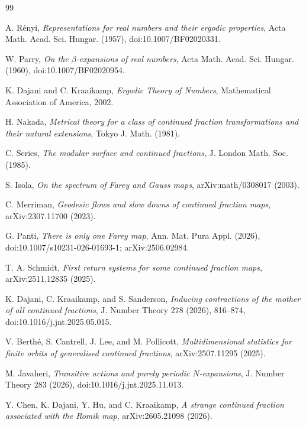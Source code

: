 \documentclass[11pt]{amsart}
\theoremstyle{definition}
\begin{document}
\begin{thebibliography}{99}

A. R\'enyi,
\emph{Representations for real numbers and their ergodic properties},
Acta Math. Acad. Sci. Hungar. (1957), doi:10.1007/BF02020331.

W. Parry,
\emph{On the $\beta$-expansions of real numbers},
Acta Math. Acad. Sci. Hungar. (1960), doi:10.1007/BF02020954.

K. Dajani and C. Kraaikamp,
\emph{Ergodic Theory of Numbers},
Mathematical Association of America, 2002.

H. Nakada,
\emph{Metrical theory for a class of continued fraction transformations and their natural extensions},
Tokyo J. Math. (1981).

C. Series,
\emph{The modular surface and continued fractions},
J. London Math. Soc. (1985).

S. Isola,
\emph{On the spectrum of Farey and Gauss maps},
arXiv:math/0308017 (2003).

C. Merriman,
\emph{Geodesic flows and slow downs of continued fraction maps},
arXiv:2307.11700 (2023).

G. Panti,
\emph{There is only one Farey map},
Ann. Mat. Pura Appl. (2026), doi:10.1007/s10231-026-01693-1; arXiv:2506.02984.

T. A. Schmidt,
\emph{First return systems for some continued fraction maps},
arXiv:2511.12835 (2025).

K. Dajani, C. Kraaikamp, and S. Sanderson,
\emph{Inducing contractions of the mother of all continued fractions},
J. Number Theory 278 (2026), 816--874, doi:10.1016/j.jnt.2025.05.015.

V. Berth\'e, S. Cantrell, J. Lee, and M. Pollicott,
\emph{Multidimensional statistics for finite orbits of generalised continued fractions},
arXiv:2507.11295 (2025).

M. Javaheri,
\emph{Transitive actions and purely periodic $N$-expansions},
J. Number Theory 283 (2026), doi:10.1016/j.jnt.2025.11.013.

Y. Chen, K. Dajani, Y. Hu, and C. Kraaikamp,
\emph{A strange continued fraction associated with the Romik map},
arXiv:2605.21098 (2026).


\end{thebibliography}
\end{document}
